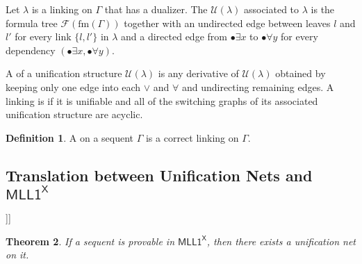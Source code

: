 \documentclass[conference,twosided,10pt]{IEEEtran}
\newcommand{\todo}[1]{{\color{red}     \noindent[\![\![{\bf TODO: }#1]\!]\!]}}
\newtheorem{thm}{Theorem}%
\theoremstyle{definition}
\newtheorem{definition}[thm]{Definition}
\newcommand*{\FOMLL}{\mathsf{MLL1^X}}
\newcommand{\cor}{\vee}
\newcommand{\single}[1]{\bullet#1}
\newcommand{\form}[1]{\mathrm{fm}(#1)}
\newcommand{\formtree}[1]{\mathcal{F}(#1)}
\newcommand{\unifstr}[1]{\mathcal{U}(#1)}
\begin{document}
Let $\lambda$ is a linking on $\Gamma$ that has a dualizer.
The  $\unifstr{\lambda}$
associated to $\lambda$ is the formula tree $\formtree{\form{\Gamma}}$ together with an undirected
edge between leaves $l$ and $l'$ for every link $\{l, l'\}$ in $\lambda$ and a
directed edge from $\single \exists x$ to $\single \forall y$ for every
dependency $(\single \exists x, \single \forall y)$.

A  of a unification structure $\unifstr{\lambda}$ is any
derivative of $\unifstr{\lambda}$ obtained by keeping only one edge into each $\cor$
and $\forall$ and undirecting remaining edges. A linking is  if it
is unifiable and all of the switching graphs of its associated unification
structure are acyclic.

\begin{definition}
  A  on a sequent $\Gamma$ is a correct linking on $\Gamma$.
\end{definition}

\subsection{Translation between Unification Nets and $\FOMLL$}

\todo{}
\begin{thm}
  If a sequent is provable in $\FOMLL$, then there exists a unification net
  on it.
\end{thm}
\end{document}
